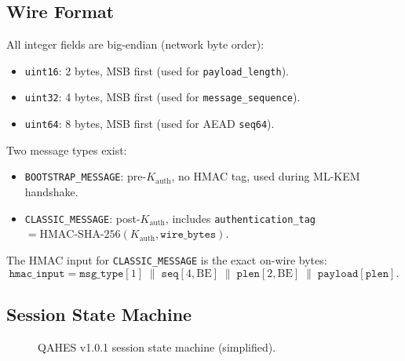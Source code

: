 \documentclass[12pt,letterpaper]{article}
\theoremstyle{plain}
\theoremstyle{definition}
\begin{document}
\subsection{Wire Format}

All integer fields are big-endian (network byte order):
\begin{itemize}[leftmargin=2em]
  \item \texttt{uint16}: 2 bytes, MSB first (used for \texttt{payload\_length}).
  \item \texttt{uint32}: 4 bytes, MSB first (used for \texttt{message\_sequence}).
  \item \texttt{uint64}: 8 bytes, MSB first (used for AEAD \texttt{seq64}).
\end{itemize}

\noindent Two message types exist:
\begin{itemize}[leftmargin=2em]
  \item \texttt{BOOTSTRAP\_MESSAGE}: pre-$K_{\mathrm{auth}}$, no HMAC tag,
    used during ML-KEM handshake.
  \item \texttt{CLASSIC\_MESSAGE}: post-$K_{\mathrm{auth}}$, includes
    \texttt{authentication\_tag} $= \mathrm{HMAC\text{-}SHA\text{-}256}(K_{\mathrm{auth}},
    \mathtt{wire\_bytes})$.
\end{itemize}

\noindent The HMAC input for \texttt{CLASSIC\_MESSAGE} is the exact on-wire bytes:
\[
  \mathtt{hmac\_input} = \mathtt{msg\_type}[1] \;\|\;
    \mathtt{seq}[4,\mathrm{BE}] \;\|\;
    \mathtt{plen}[2,\mathrm{BE}] \;\|\; \mathtt{payload}[\mathtt{plen}].
    \tag{25}
\]

\subsection{Session State Machine}

\begin{figure}[H]
\centering
{}
\caption{QAHES v1.0.1 session state machine (simplified).}
\end{figure}
\end{document}
